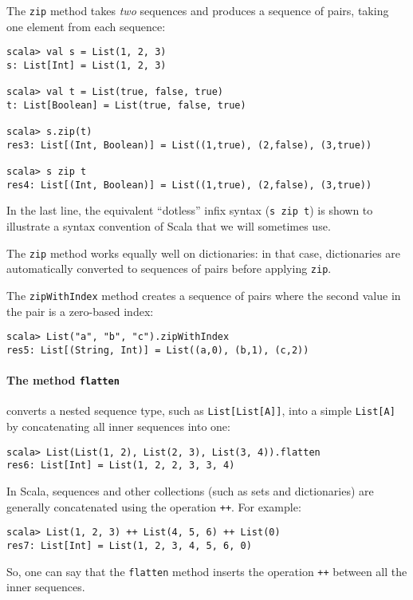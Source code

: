 The \lstinline!zip! method takes \emph{two} sequences and produces
a sequence of pairs, taking one element from each sequence:
\begin{lstlisting}
scala> val s = List(1, 2, 3)
s: List[Int] = List(1, 2, 3)

scala> val t = List(true, false, true)
t: List[Boolean] = List(true, false, true)

scala> s.zip(t)
res3: List[(Int, Boolean)] = List((1,true), (2,false), (3,true))

scala> s zip t
res4: List[(Int, Boolean)] = List((1,true), (2,false), (3,true)) 
\end{lstlisting}
In the last line, the equivalent \textsf{``}dotless\textsf{''} infix syntax (\lstinline!s zip t!)
is shown to illustrate a syntax convention of Scala that we will sometimes
use.

The \lstinline!zip! method works equally well on dictionaries: in
that case, dictionaries are automatically converted to sequences of
pairs before applying \lstinline!zip!.

The \lstinline!zipWithIndex! method creates a sequence of pairs where
the second value in the pair is a zero-based index:
\begin{lstlisting}
scala> List("a", "b", "c").zipWithIndex
res5: List[(String, Int)] = List((a,0), (b,1), (c,2)) 
\end{lstlisting}


\paragraph*{The method \texttt{flatten}}

converts a nested sequence type, such as \lstinline!List[List[A]]!,
into a simple \lstinline!List[A]! by concatenating all inner sequences
into one:
\begin{lstlisting}
scala> List(List(1, 2), List(2, 3), List(3, 4)).flatten
res6: List[Int] = List(1, 2, 2, 3, 3, 4)
\end{lstlisting}
In Scala, sequences and other collections (such as sets and dictionaries)
are generally concatenated using the operation \lstinline!++!. For
example:
\begin{lstlisting}
scala> List(1, 2, 3) ++ List(4, 5, 6) ++ List(0)
res7: List[Int] = List(1, 2, 3, 4, 5, 6, 0)
\end{lstlisting}
So, one can say that the \lstinline!flatten! method inserts the operation
\lstinline!++! between all the inner sequences.


